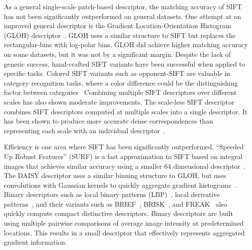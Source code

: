         As a general single-scale patch-based descriptor, the matching accuracy of SIFT has not been significantly
        outperformed on general datasets.
        One attempt at an improved general descriptor is the Gradient Location-Orientation Histogram (GLOH)
        descriptor~\cite{mikolajczyk_performance_2005}. GLOH uses a similar structure to SIFT but replaces the
        rectangular-bins with log-polar bins. GLOH did achieve higher matching accuracy on some datasets, but it
        was not by a significant margin.
        Despite the lack of generic success, hand-crafted SIFT variants have been successful when applied to
        specific tasks.
        Colored SIFT variants such as opponent-SIFT are valuable in category recognition tasks, where a color
        difference could be the distinguishing factor between categories~\cite{van_de_sande_evaluating_2010}
        Combining multiple SIFT descriptors over different scales has also shown moderate improvements. The
        scale-less SIFT descriptor combines SIFT descriptors computed at multiple scales into a single descriptor.
        It has been shown to produce more accurate dense correspondences than representing each scale with an
        individual descriptor~\cite{hassner_sifts_2012}.

        Efficiency is one area where SIFT has been significantly outperformed. ``Speeded Up Robust Features''
        (SURF) is a fast approximation to SIFT based on integral images that achieves similar accuracy using a
        smaller $64$ dimensional descriptor~\cite{bay_surf_2006}.
        The DAISY descriptor uses a similar binning structure to GLOH, but uses convolutions with Gaussian kernels
        to quickly aggregate gradient histograms~\cite{tola_fast_2008}.
        Binary descriptors such as local binary patterns (LBP)~\cite{ojala_comparative_1996, zhang_local_2010},
        local derivative patterns~\cite{heikkila_description_2009}, and their variants such as
        BRIEF~\cite{calonder_brief_2010}, BRISK~\cite{leutenegger_brisk_2011}, and FREAK~\cite{alahi_freak_2012}
        also quickly compute compact distinctive descriptors. Binary descriptors are built using multiple pairwise
        comparisons of average image intensity at predetermined locations. This results in a small descriptor that
        effectively represents aggregated gradient information.

